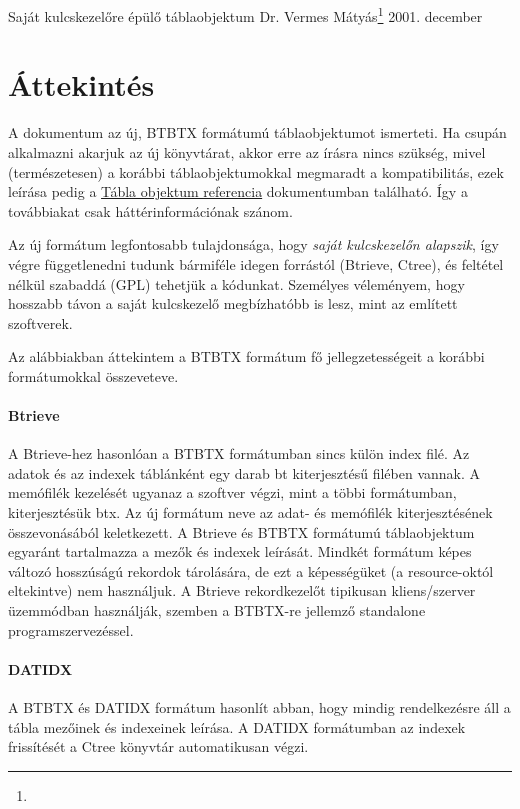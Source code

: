 
\pagetitle%
{Saját kulcskezelőre épülő táblaobjektum}%
{Dr. Vermes Mátyás\footnote{\ComFirm}}%
{2001. december}

\section{Áttekintés}
 
A dokumentum az új, BTBTX formátumú táblaobjektumot ismerteti.
Ha csupán alkalmazni akarjuk az új könyvtárat, akkor erre az írásra
nincs szükség, mivel (természetesen) a korábbi táblaobjektumokkal
megmaradt a kompatibilitás, ezek leírása pedig a 
\href{tabobj.html}{Tábla objektum referencia} dokumentumban található.
Így a továbbiakat csak háttérinformációnak szánom.

Az új formátum legfontosabb tulajdonsága, hogy {\it saját kulcskezelőn
alapszik}, így végre függetlenedni tudunk bármiféle idegen
forrástól (Btrieve, Ctree), és feltétel nélkül szabaddá (GPL)
tehetjük a kódunkat. Személyes véleményem, hogy hosszabb távon
a saját kulcskezelő megbízhatóbb is lesz, mint az említett
szoftverek.

Az alábbiakban áttekintem a BTBTX formátum fő jellegzetességeit
a korábbi formátumokkal összeveteve.

\paragraph{Btrieve}

A Btrieve-hez hasonlóan a BTBTX formátumban sincs külön index filé.
Az adatok és az indexek táblánként egy darab  bt kiterjesztésű filében 
vannak. A memófilék kezelését ugyanaz a szoftver végzi, mint a 
többi formátumban, kiterjesztésük btx. Az új formátum neve az adat- és 
memófilék kiterjesztésének összevonásából keletkezett.
A Btrieve és BTBTX formátumú táblaobjektum egyaránt tartalmazza
a mezők és indexek leírását. Mindkét formátum képes változó
hosszúságú rekordok tárolására, de ezt a képességüket
(a resource-októl eltekintve) nem használjuk.
A Btrieve rekordkezelőt tipikusan kliens/szerver üzemmódban
használják, szemben a BTBTX-re jellemző standalone programszervezéssel.

\paragraph{DATIDX}
 
A BTBTX és DATIDX formátum hasonlít abban, hogy mindig rendelkezésre
áll a tábla mezőinek és indexeinek leírása. A DATIDX formátumban
az indexek frissítését a Ctree könyvtár automatikusan végzi.
 
